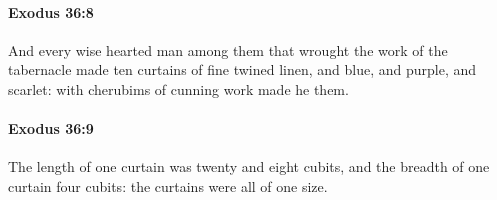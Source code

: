 		\paragraph{Exodus 36:8} %
			\label{EXODUS-36-8}

			And every wise hearted man among them that wrought the work of the tabernacle made ten curtains of fine twined linen, and blue, and purple, and scarlet: with cherubims of cunning work made he them.


		\paragraph{Exodus 36:9} %
			\label{EXODUS-36-9}

			The length of one curtain was twenty and eight cubits, and the breadth of one curtain four cubits: the curtains were all of one size.


